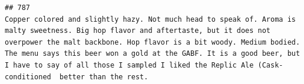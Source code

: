\documentclass[
  a4paper,
]{article}
\begin{document}
\begin{verbatim}
## 787                                                                                                                                                                                                                                                                                                                                                                                                                                                                                                                                                                                                                                                                                                                                                                                                                                                                                                                                                                                                                                                                                                                                                                                                                                                                                                                                                                                              Copper colored and slightly hazy. Not much head to speak of. Aroma is malty sweetness. Big hop flavor and aftertaste, but it does not overpower the malt backbone. Hop flavor is a bit woody. Medium bodied. The menu says this beer won a gold at the GABF. It is a good beer, but I have to say of all those I sampled I liked the Replic Ale (Cask-conditioned  better than the rest.

\end{verbatim}
\end{document}
